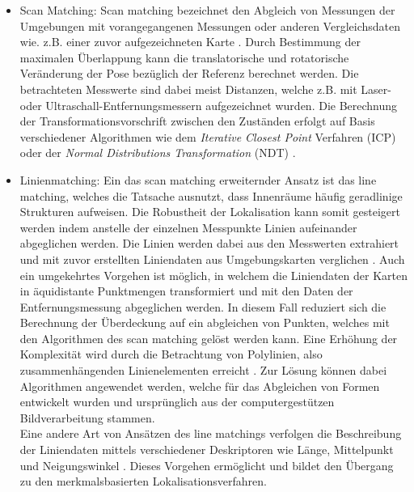 \begin{itemize}

\item Scan Matching: Scan matching bezeichnet den Abgleich von Messungen der Umgebungen mit vorangegangenen Messungen \cite{Gutmann1996} oder anderen Vergleichsdaten wie. z.B. einer zuvor aufgezeichneten Karte \cite{Gutmann1998}. Durch Bestimmung der maximalen Überlappung kann die translatorische und rotatorische Veränderung der Pose bezüglich der Referenz berechnet werden. Die betrachteten Messwerte sind dabei meist Distanzen, welche z.B. mit Laser- \cite{Diosi2007} oder Ultraschall-Entfernungsmessern \cite{Burguera2005} aufgezeichnet wurden. Die Berechnung der Transformationsvorschrift zwischen den Zuständen erfolgt auf Basis verschiedener Algorithmen wie dem \textit{Iterative Closest Point} Verfahren (ICP) \cite{Besl1992}\cite{Lu1994} oder der \textit{Normal Distributions Transformation} (NDT) \cite{Biber2003}.

\item Linienmatching: Ein das scan matching erweiternder Ansatz ist das line matching, welches die Tatsache ausnutzt, dass Innenräume häufig geradlinige Strukturen aufweisen. Die Robustheit der Lokalisation kann somit gesteigert werden indem anstelle der einzelnen Messpunkte Linien aufeinander abgeglichen werden. Die Linien werden dabei aus den Messwerten extrahiert und mit zuvor erstellten Liniendaten aus Umgebungskarten verglichen \cite{Cox1991}\cite{Gutmann1999}. Auch ein umgekehrtes Vorgehen ist möglich, in welchem die Liniendaten der Karten in äquidistante Punktmengen transformiert und mit den Daten der Entfernungsmessung abgeglichen werden. In diesem Fall reduziert sich die Berechnung der Überdeckung auf ein abgleichen von Punkten, welches mit den Algorithmen des scan matching gelöst werden kann. Eine Erhöhung der Komplexität wird durch die Betrachtung von Polylinien, also zusammenhängenden Linienelementen erreicht \cite{Wolter2004}. Zur Lösung können dabei Algorithmen angewendet werden, welche für das Abgleichen von Formen entwickelt wurden und ursprünglich aus der computergestützen Bildverarbeitung stammen.\\
Eine andere Art von Ansätzen des line matchings verfolgen die Beschreibung der Liniendaten mittels verschiedener Deskriptoren wie Länge, Mittelpunkt und Neigungswinkel . Dieses Vorgehen ermöglicht \red[XXX] und bildet den Übergang zu den merkmalsbasierten Lokalisationsverfahren.


\end{itemize}
